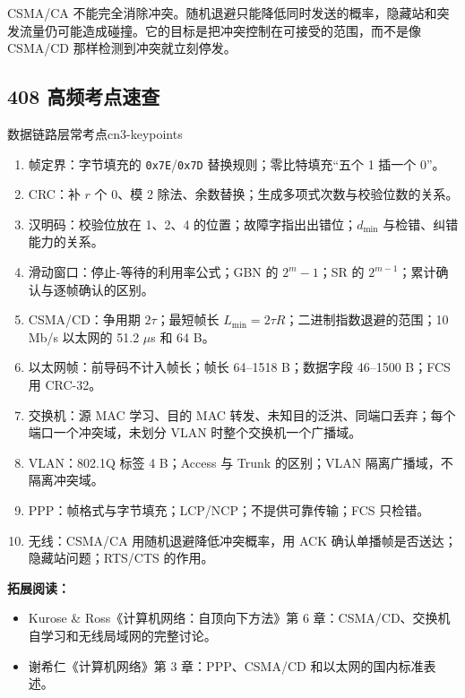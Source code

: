 CSMA/CA 不能完全消除冲突。随机退避只能降低同时发送的概率，隐藏站和突发流量仍可能造成碰撞。它的目标是把冲突控制在可接受的范围，而不是像 CSMA/CD 那样检测到冲突就立刻停发。

\subsection{408 高频考点速查}

\begin{conclusion}{数据链路层常考点}{cn3-keypoints}
\begin{enumerate}
  \item 帧定界：字节填充的 \texttt{0x7E}/\texttt{0x7D} 替换规则；零比特填充“五个 1 插一个 0”。
  \item CRC：补 $r$ 个 0、模 2 除法、余数替换；生成多项式次数与校验位数的关系。
  \item 汉明码：校验位放在 1、2、4 的位置；故障字指出出错位；$d_{\min}$ 与检错、纠错能力的关系。
  \item 滑动窗口：停止-等待的利用率公式；GBN 的 $2^m-1$；SR 的 $2^{m-1}$；累计确认与逐帧确认的区别。
  \item CSMA/CD：争用期 $2\tau$；最短帧长 $L_{\min}=2\tau R$；二进制指数退避的范围；10 Mb/s 以太网的 51.2 $\mu$s 和 64 B。
  \item 以太网帧：前导码不计入帧长；帧长 64--1518 B；数据字段 46--1500 B；FCS 用 CRC-32。
  \item 交换机：源 MAC 学习、目的 MAC 转发、未知目的泛洪、同端口丢弃；每个端口一个冲突域，未划分 VLAN 时整个交换机一个广播域。
  \item VLAN：802.1Q 标签 4 B；Access 与 Trunk 的区别；VLAN 隔离广播域，不隔离冲突域。
  \item PPP：帧格式与字节填充；LCP/NCP；不提供可靠传输；FCS 只检错。
  \item 无线：CSMA/CA 用随机退避降低冲突概率，用 ACK 确认单播帧是否送达；隐藏站问题；RTS/CTS 的作用。
\end{enumerate}
\end{conclusion}

\noindent\textbf{拓展阅读：}
\begin{itemize}
  \item Kurose \& Ross《计算机网络：自顶向下方法》第 6 章：CSMA/CD、交换机自学习和无线局域网的完整讨论。
  \item 谢希仁《计算机网络》第 3 章：PPP、CSMA/CD 和以太网的国内标准表述。
\end{itemize}

\newpage

